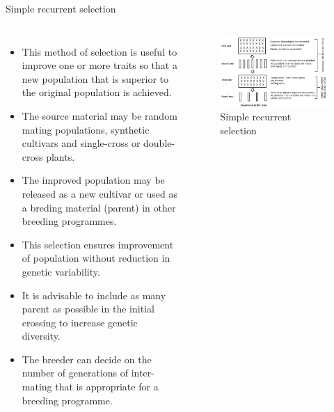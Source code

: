 \documentclass[11pt,ignorenonframetext,aspectratio=169]{beamer}
\providecommand{\tightlist}{%
  \setlength{\itemsep}{0pt}\setlength{\parskip}{0pt}}
\newcommand{\bcolumns}{\begin{columns}[T, onlytextwidth]}
\newcommand{\ecolumns}{\end{columns}}
\begin{document}
\begin{frame}{Simple recurrent selection}
\protect\hypertarget{simple-recurrent-selection}{}
\bcolumns
{}
\small

\begin{itemize}
\tightlist
\item
  This method of selection is useful to improve one or more traits so
  that a new population that is superior to the original population is
  achieved.
\item
  The source material may be random mating populations, synthetic
  cultivars and single-cross or double-cross plants.
\item
  The improved population may be released as a new cultivar or used as a
  breding material (parent) in other breeding programmes.
\item
  This selection ensures improvement of population without reduction in
  genetic variability.
\item
  It is advisable to include as many parent as possible in the initial
  crossing to increase genetic diversity.
\item
  The breeder can decide on the number of generations of inter-mating
  that is appropriate for a breeding programme.
\end{itemize}


\begin{figure}

{\centering \includegraphics[width=0.98\linewidth]{./images/simple_recurrent_selection} 

}

\caption{Simple recurrent selection}\label{fig:simple-recurrent-selection}
\end{figure}

\ecolumns
\end{frame}
\end{document}
